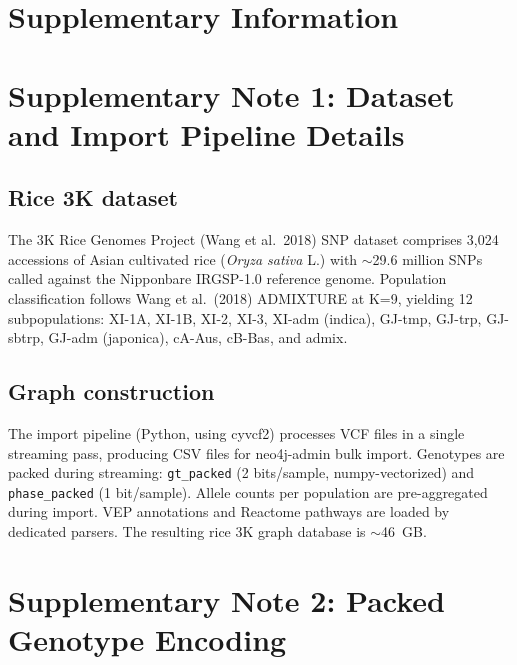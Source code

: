 \clearpage
\setcounter{section}{0}
\setcounter{figure}{0}
\setcounter{table}{0}
\renewcommand{\thefigure}{S\arabic{figure}}
\renewcommand{\thetable}{S\arabic{table}}
\renewcommand{\thesection}{S\arabic{section}}

\section*{Supplementary Information}

\section{Supplementary Note 1: Dataset and Import Pipeline Details}

\subsection{Rice 3K dataset}

The 3K Rice Genomes Project (Wang et al.\ 2018) SNP dataset comprises 3{,}024 accessions of Asian cultivated rice (\emph{Oryza sativa} L.) with $\sim$29.6 million SNPs called against the Nipponbare IRGSP-1.0 reference genome. Population classification follows Wang et al.\ (2018) ADMIXTURE at K=9, yielding 12 subpopulations: XI-1A, XI-1B, XI-2, XI-3, XI-adm (indica), GJ-tmp, GJ-trp, GJ-sbtrp, GJ-adm (japonica), cA-Aus, cB-Bas, and admix.

\subsection{Graph construction}

The import pipeline (Python, using cyvcf2) processes VCF files in a single streaming pass, producing CSV files for neo4j-admin bulk import. Genotypes are packed during streaming: \texttt{gt\_packed} (2 bits/sample, numpy-vectorized) and \texttt{phase\_packed} (1 bit/sample). Allele counts per population are pre-aggregated during import. VEP annotations and Reactome pathways are loaded by dedicated parsers. The resulting rice 3K graph database is $\sim$46~GB.

\section{Supplementary Note 2: Packed Genotype Encoding}


